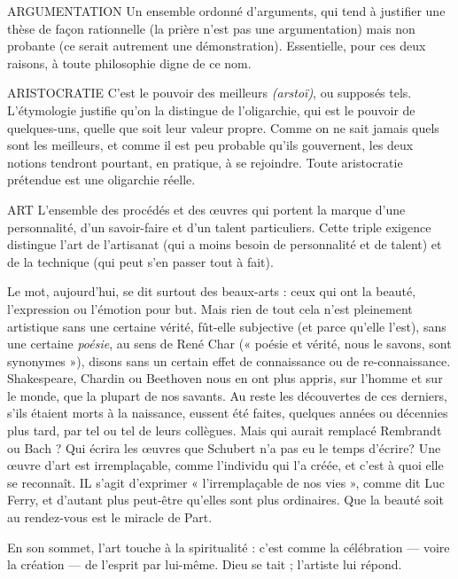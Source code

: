ARGUMENTATION Un ensemble ordonné d’arguments, qui tend à justifier
une thèse de façon rationnelle (la prière n’est pas
une argumentation) mais non probante (ce serait autrement une démonstration).
Essentielle, pour ces deux raisons, à toute philosophie digne de ce nom.

ARISTOCRATIE C’est le pouvoir des meilleurs {\it (arstoï)}, ou supposés tels.
L'étymologie justifie qu’on la distingue de l’oligarchie, qui
est le pouvoir de quelques-uns, quelle que soit leur valeur propre. Comme on
ne sait jamais quels sont les meilleurs, et comme il est peu probable qu’ils gouvernent,
les deux notions tendront pourtant, en pratique, à se rejoindre. Toute
aristocratie prétendue est une oligarchie réelle.

ART L'ensemble des procédés et des œuvres qui portent la marque d’une
personnalité, d’un savoir-faire et d’un talent particuliers. Cette triple
exigence distingue l’art de l'artisanat (qui a moins besoin de personnalité et de
talent) et de la technique (qui peut s’en passer tout à fait).

Le mot, aujourd’hui, se dit surtout des beaux-arts : ceux qui ont la beauté,
l'expression ou l'émotion pour but. Mais rien de tout cela n’est pleinement
artistique sans une certaine vérité, fût-elle subjective (et parce qu’elle l’est),
sans une certaine {\it poésie}, au sens de René Char (« poésie et vérité, nous le
savons, sont synonymes »), disons sans un certain effet de connaissance ou de
re-connaissance. Shakespeare, Chardin ou Beethoven nous en ont plus appris,
sur l’homme et sur le monde, que la plupart de nos savants. Au reste les découvertes
de ces derniers, s’ils étaient morts à la naissance, eussent été faites,
quelques années ou décennies plus tard, par tel ou tel de leurs collègues. Mais
qui aurait remplacé Rembrandt ou Bach ? Qui écrira les œuvres que Schubert
n'a pas eu le temps d'écrire? Une œuvre d’art est irremplaçable, comme
l'individu qui l’a créée, et c’est à quoi elle se reconnaît. IL s’agit d’exprimer
« l’irremplaçable de nos vies », comme dit Luc Ferry, et d’autant plus peut-être
qu'elles sont plus ordinaires. Que la beauté soit au rendez-vous est le miracle de
Part.

En son sommet, l’art touche à la spiritualité : c’est comme la célébration —
voire la création — de l'esprit par lui-même. Dieu se tait ; l’artiste lui répond.

